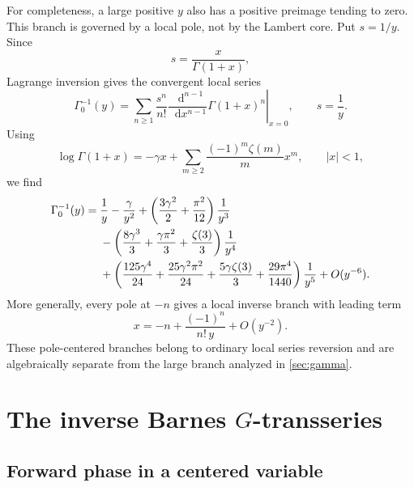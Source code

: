 \documentclass[11pt,oneside]{article}
\theoremstyle{plain}
\theoremstyle{definition}
\theoremstyle{remark}
\newcommand{\dd}{\mathop{}\!\mathrm{d}}
\begin{document}
For completeness, a large positive \(y\) also has a positive preimage tending
to zero.  This branch is governed by a local pole, not by the Lambert core.
Put \(s=1/y\).  Since
\begin{equation}
 s=\frac{x}{\Gamma(1+x)},
 \label{eq:small-gamma-relation}
\end{equation}
Lagrange inversion gives the convergent local series
\begin{equation}
 \Gamma_0^{-1}(y)
 =\sum_{n\ge1}\frac{s^n}{n!}
 \left.
 \frac{\dd^{n-1}}{\dd x^{n-1}}\Gamma(1+x)^n
 \right|_{x=0},
 \qquad s=\frac1y.
 \label{eq:gamma-small-lagrange}
\end{equation}
Using
\begin{equation}
 \log\Gamma(1+x)
 =-\gamma x+\sum_{m\ge2}\frac{(-1)^m\zeta(m)}{m}x^m,
 \qquad |x|<1,
 \label{eq:loggamma-near-one}
\end{equation}
we find
\begin{align}
 \Gamma_0^{-1}(y)={}&\frac1y-\frac{\gamma}{y^2}
 +\left(\frac{3\gamma^2}{2}+\frac{\pi^2}{12}\right)\frac1{y^3}
 \notag\\
 &-\left(\frac{8\gamma^3}{3}+\frac{\gamma\pi^2}{3}
 +\frac{\zeta(3)}{3}\right)\frac1{y^4}
 \notag\\
 &+\left(\frac{125\gamma^4}{24}
 +\frac{25\gamma^2\pi^2}{24}
 +\frac{5\gamma\zeta(3)}{3}
 +\frac{29\pi^4}{1440}\right)\frac1{y^5}
 +O(y^{-6}).
 \label{eq:gamma-small-explicit}
\end{align}
More generally, every pole at \(-n\) gives a local inverse branch with leading
term
\begin{equation}
 x=-n+\frac{(-1)^n}{n!\,y}+O(y^{-2}).
 \label{eq:gamma-pole-branches}
\end{equation}
These pole-centered branches belong to ordinary local series reversion and are
algebraically separate from the large branch analyzed in
\cref{sec:gamma}.

\section{The inverse Barnes \texorpdfstring{\(G\)}{G}-transseries}
\label{sec:barnes}

\subsection{Forward phase in a centered variable}
\end{document}

